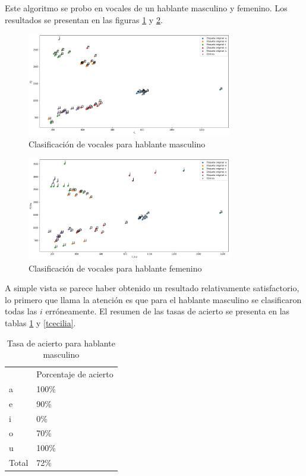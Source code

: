 \documentclass[a4paper]{article}
\begin{document}
Este algoritmo se probo en vocales de un hablante masculino y femenino. Los resultados se presentan en las figuras \ref{martin} y \ref{cecilia}. 

\begin{figure}[h!]
\centering
\includegraphics[width=0.8\textwidth]{martin.png}
\caption{Clasificación de vocales para hablante masculino}
\label{martin}
\end{figure}

\begin{figure}[h!]
\centering
\includegraphics[width=0.8\textwidth]{cecilia.png}
\caption{Clasificación de vocales para hablante femenino}
\label{cecilia}
\end{figure}

A simple vista se parece haber obtenido un resultado relativamente satisfactorio, lo primero que llama la atención es que para el hablante masculino se clasificaron todas las $i$ erróneamente. El resumen de las tasas de acierto se presenta en las tablas \ref{tmartin} y \ref{tcecilia}.

\begin{table}[!h]
\centering
\begin{tabular}{ll}
      & Porcentaje de acierto \\
a     & 100\%                 \\
e     & 90\%                  \\
i     & 0\%                   \\
o     & 70\%                  \\
u     & 100\%                 \\
Total & 72\%                 
\end{tabular}
\caption{Tasa de acierto para hablante masculino}
\label{tmartin}
\end{table}
\end{document}
